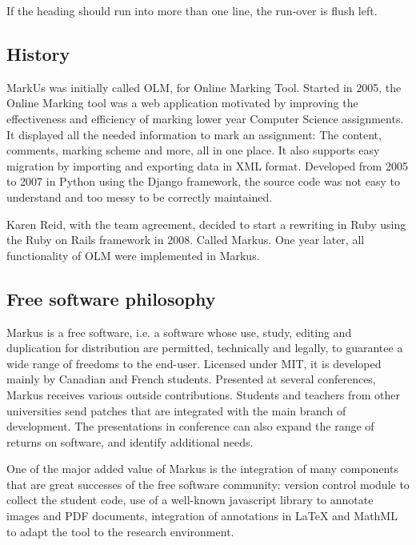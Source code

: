 \documentclass[twocolumn,10pt]{asme2e}
\begin{document}
If the heading should run into more than one line, the run-over is flush left.

\subsection*{History}


MarkUs was initially called OLM, for Online Marking Tool. Started in 2005, the Online Marking tool was a web application motivated by improving the effectiveness and efficiency of marking lower year Computer Science assignments. It displayed all the needed information to mark an assignment: The content, comments, marking scheme and more, all in one place. It also supports easy migration by importing and exporting data in XML format. Developed from 2005 to 2007 in Python using the Django framework, the source code was not easy to understand and too messy to be correctly maintained.

Karen Reid, with the team agreement, decided to start a rewriting in Ruby using the Ruby on Rails framework in 2008. Called Markus. One year later, all functionality of OLM were implemented in Markus.


\subsection*{Free software philosophy}
Markus is a free software, i.e. a software whose use, study, editing and duplication for distribution are permitted, technically and legally, to guarantee a wide range of freedoms to the end-user. Licensed under MIT, it is developed mainly by Canadian and French students.
Presented at several conferences, Markus receives various outside contributions. Students and teachers from other universities send patches that are integrated with the main branch of development. The presentations in conference can also expand the range of returns on software, and identify additional needs.

One of the major added value of Markus is the integration of many components that are great successes of the free software community: version control module to collect the student code, use of a well-known javascript library to annotate images and PDF documents, integration of annotations in LaTeX and MathML to adapt the tool to the research environment. 
\end{document}
